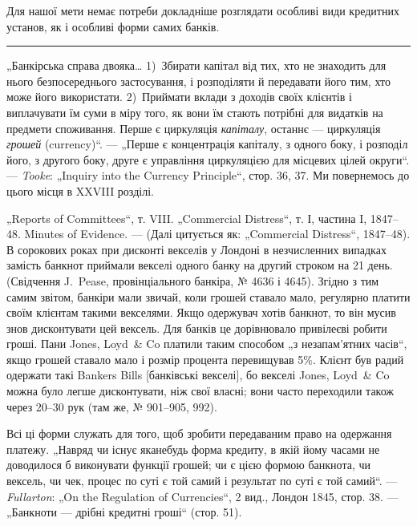 Для нашої мети немає потреби докладніше розглядати особливі види кредитних установ, як і особливі
форми самих банків.

\pfbreak{}

„Банкірська справа двояка\dots{} 1)~Збирати капітал від тих, хто не знаходить
для нього безпосереднього застосування, і розподіляти й передавати його
тим, хто може його використати. 2)~Приймати вклади з доходів своїх клієнтів
і виплачувати їм суми в міру того, як вони їм стають потрібні для видатків
на предмети споживання. Перше є циркуляція \emph{капіталу}, останнє — циркуляція
\emph{грошей} (currency)“. — „Перше є концентрація капіталу, з одного боку, і розподіл його, з другого
боку, друге є управління циркуляцією для місцевих
цілей округи“. — \emph{Tooke}: „Inquiry into the Currency Principle“, стор. 36, 37. Ми
повернемось до цього місця в XXVIII розділі.

„Reports of Committees“, т. VIII. „Commercial Distress“, т. І, частина I, 1847--48.
Minutes of Evidence. — (Далі цитується як: „Commercial Distress“, 1847--48). В сорокових роках при
дисконті векселів у Лондоні в незчисленних випадках замість банкнот приймали векселі одного банку на
другий строком на 21 день.
(Свідчення J.~Pease, провінціального банкіра, № 4636 і 4645). Згідно з тим самим звітом, банкіри
мали звичай, коли грошей ставало мало, регулярно платити
своїм клієнтам такими векселями. Якщо одержувач хотів банкнот, то він мусив
знов дисконтувати цей вексель. Для банків це дорівнювало привілеєві робити
гроші. Пани Jones, Loyd~\& Co платили таким способом „з незапам’ятних часів“,
якщо грошей ставало мало і розмір процента перевищував 5\%. Клієнт був
радий одержати такі Bankers Bills [банківські векселі], бо векселі Jones, Loyd~\& Co
можна було легше дисконтувати, ніж свої власні; вони часто переходили також через 20--30 рук
(там же, № 901--905, 992).

Всі ці форми служать для того, щоб зробити передаваним право на одержання платежу. „Навряд чи існує
яканебудь форма кредиту, в якій йому часами
не доводилося б виконувати функції грошей; чи є цією формою банкнота, чи
вексель, чи чек, процес по суті є той самий і результат по суті є той самий“. — \emph{Fullarton}: „On the
Regulation of Currencies“, 2 вид., Лондон 1845, стор. 38. — „Банкноти — дрібні кредитні гроші“
(стор. 51).

